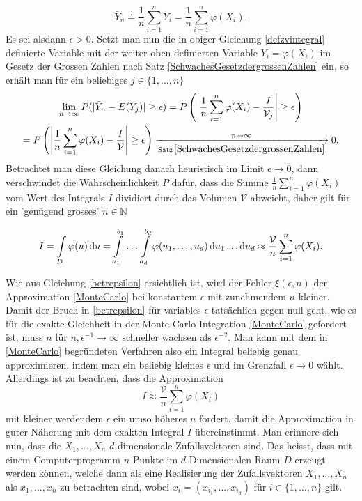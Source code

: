 \documentclass[a4paper,12pt]{article}
\begin{document}
\begin{equation}
\bar{Y}_n \doteq \frac{1}{n}\sum_{i=1}^{n}Y_i = \frac{1}{n}\sum_{i=1}^{n}\varphi(X_i).
\end{equation} Es sei alsdann $\epsilon > 0.$ Setzt man nun die in obiger Gleichung \eqref{defzvintegral} definierte Variable mit der weiter oben definierten Variable $Y_i = \varphi(X_i)$ im Gesetz der Grossen Zahlen nach Satz \ref{SchwachesGesetzdergrossenZahlen} ein, so erhält man für ein beliebiges $j \in \{1,\dots,n\}$ \begin{gather}
\lim\limits_{n \rightarrow \infty}P(|\bar{Y}_n-E(Y_j)|\geq \epsilon) = P\left(\left|\frac{1}{n}\sum_{i=1}^{n}\varphi(X_i)-\frac{I}{\mathcal{V}_j}\right|\geq \epsilon\right) \nonumber \\ = P\left(\left|\frac{1}{n}\sum_{i=1}^{n}\varphi(X_i)-\frac{I}{\mathcal{V}}\right|\geq \epsilon\right) \xrightarrow[\mathrm{Satz}\, \ref{SchwachesGesetzdergrossenZahlen}]{n \rightarrow \infty} 0.
\end{gather} Betrachtet man diese Gleichung danach heuristisch im Limit $\epsilon \rightarrow 0$, dann verschwindet die Wahrscheinlichkeit $P$ dafür, dass die Summe $\frac{1}{n}\sum_{i=1}^{n}\varphi(X_i)$ vom Wert des Integrals $I$ dividiert durch das Volumen $\mathcal{V}$ abweicht, daher gilt für ein 'genügend grosses' $n \in \mathbb{N}$ 
\begin{mdframed}
\begin{equation}\label{MonteCarlo}
I = \int\displaylimits_{D} \varphi(u) \, \mathrm{d}u = \int\displaylimits_{a_1}^{b_1} \,\dots \, \int\displaylimits_{a_d}^{b_d} \varphi(u_1,\dots,u_d) \,\mathrm{d}u_1\dots \mathrm{d}u_d \approx \frac{\mathcal{V}}{n}\sum_{i=1}^{n}\varphi(X_i).
\end{equation} 
\end{mdframed}
Wie aus Gleichung \eqref{betrepsilon} ersichtlich ist, wird der Fehler $\xi(\epsilon,n)$ der Approximation \eqref{MonteCarlo} bei konstantem $\epsilon$ mit zunehmendem $n$ kleiner. Damit der Bruch in \eqref{betrepsilon} für variables $\epsilon$ tatsächlich gegen null geht, wie es für die exakte Gleichheit in der Monte-Carlo-Integration \eqref{MonteCarlo} gefordert ist, muss $n$ für $n,\epsilon^{-1} \rightarrow \infty$ schneller wachsen als $\epsilon^{-2}.$  Man kann mit dem in \eqref{MonteCarlo} begründeten Verfahren also ein Integral beliebig genau approximieren, indem man ein beliebig kleines $\epsilon$ und im Grenzfall $\epsilon \rightarrow 0$ wählt. Allerdings ist zu beachten, dass die Approximation \begin{equation}
	I \approx \frac{\mathcal{V}}{n}\sum_{i=1}^{n}\varphi(X_i)
\end{equation} mit kleiner werdendem $\epsilon$ ein umso höheres $n$ fordert, damit die Approximation in guter Näherung mit dem exakten Integral $I$ übereinstimmt. Man erinnere sich nun, dass die $X_1,\dots,X_n$ $d$-dimensionale Zufallsvektoren sind. Das heisst, dass mit einem Computerprogramm $n$ Punkte im $d$-Dimensionalen Raum $D$ erzeugt werden können, welche dann als eine Realisierung der Zufallsvektoren $X_1,\dots,X_n$ als $x_1,\dots,x_n$ zu betrachten sind, wobei $x_i = (x_{i_1},\dots,x_{i_d})$ für $i \in \{1,\dots,n\}$ gilt.
\end{document}
